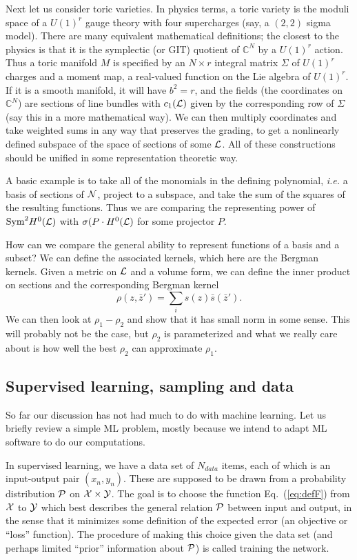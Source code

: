\documentclass[12pt]{article}
\def\IC{\mathbb{C}}
\def\CN {{\cal N}}
\def\CP {{\cal P }}
\def\CL {{\cal L}}
\def\CX {{\cal X}}
\def\CY{{\cal Y}}
\newcommand{\eq}[1]{Eq.~(\ref{eq:#1})}
\newcommand{\be}{\begin{equation}}
\newcommand{\ee}{\end{equation}}
\begin{document}
Next let us consider toric varieties.  In physics terms, a toric variety is the moduli space of a
$U(1)^r$ gauge theory with four supercharges (say, a $(2,2)$ sigma model).  There are many
equivalent mathematical definitions; the closest to the physics is that it is the symplectic (or GIT) quotient
of $\IC^N$ by a $U(1)^r$ action.  Thus a toric manifold $M$ is specified by 
an $N\times r$ integral matrix $\Sigma$ of $U(1)^r$  charges and a moment map, a real-valued function on the
Lie algebra of $U(1)^r$.  If it is a smooth manifold, it will have $b^2=r$, and the fields (the coordinates
on $\IC^N$) are sections of line bundles with $c_1(\CL)$ given by the corresponding row of $\Sigma$
(say this in a more mathematical way).  We can then multiply coordinates and take weighted sums in any way that
preserves the grading, to get a nonlinearly defined subspace of the space of sections of some $\CL$.
All of these constructions should be unified in some representation theoretic way.

A basic example is to take all of the monomials in the defining polynomial, {\it i.e.} a basis of sections of $\CN$,
project to a subspace, and take the sum of the squares of the resulting functions.  Thus we are comparing the
representing power of $\mbox{Sym}^2 H^0(\CL)$ with $\sigma(P\cdot H^0(\CL)$ for some projector $P$.

How can we compare the general ability to represent functions of a basis and a subset?
We can define the associated kernels, which here are the Bergman kernels.  Given a metric on
$\CL$ and a volume form, we can define the inner product on sections and the corresponding Bergman
kernel
\be
\rho(z,\bar z') = \sum_i s(z)\bar s(\bar z') .
\ee
We can then look at $\rho_1-\rho_2$ and show that it has small norm in some sense.
This will probably not be the case, but $\rho_2$ is parameterized and what we really care about is
how well the best $\rho_2$ can approximate $\rho_1$.


\subsection{ Supervised learning, sampling and data }

So far our discussion has not had much to do with machine learning.  Let us briefly review a simple
ML problem, mostly because we intend to adapt ML software to do our computations.

In supervised learning, we have a data set of $N_{data}$ items, each of which is an input-output pair $(x_n,y_n)$.
These are supposed to be drawn from a probability distribution $\CP$ on $\CX\times\CY$.
The goal is to choose the function \eq{defF} from $\CX$ to $\CY$
which best describes the general relation $\CP$ between input and output,
in the sense that it minimizes some definition of the expected error (an objective or ``loss'' function).
The procedure of making this choice given the data set (and perhaps limited ``prior'' information about $\CP$)
is called training the network.
\end{document}
